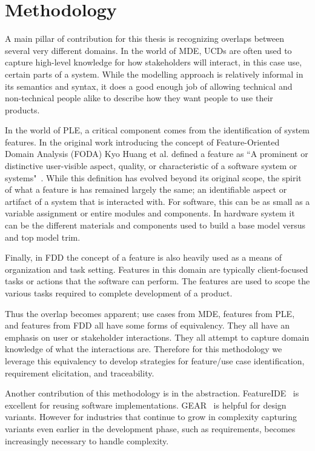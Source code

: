 \chapter{Methodology}



A main pillar of contribution for this thesis is recognizing overlaps between several very different domains. In the world of \ac{MDE}, \ac{UCD}s are often used to capture high-level knowledge for how stakeholders will interact, in this case use, certain parts of a system. While the modelling approach is relatively informal in its semantics and syntax, it does a good enough job of allowing technical and non-technical people alike to describe how they want people to use their products.

In the world of \ac{PLE}, a critical component comes from the identification of system features. In the original work introducing the concept of Feature-Oriented Domain Analysis (FODA) Kyo Huang et al. defined a feature as ``A prominent or distinctive user-visible aspect, quality, or characteristic of a software system or systems"~\cite{kang1990feature}. While this definition has evolved beyond its original scope, the spirit of what a feature is has remained largely the same; an identifiable aspect or artifact of a system that is interacted with. For software, this can be as small as a variable assignment or entire modules and components. In hardware system it can be the different materials and components used to build a base model versus and top model trim.

Finally, in \ac{FDD} the concept of a feature is also heavily used as a means of organization and task setting. Features in this domain are typically client-focused tasks or actions that the software can perform. The features are used to scope the various tasks required to complete development of a product. 

Thus the overlap becomes apparent; use cases from \ac{MDE}, features from \ac{PLE}, and features from \ac{FDD} all have some forms of equivalency. They all have an emphasis on user or stakeholder interactions. They all attempt to capture domain knowledge of what the interactions are. Therefore for this methodology we leverage this equivalency to develop strategies for feature/use case identification, requirement elicitation, and traceability.

Another contribution of this methodology is in the abstraction. FeatureIDE~\cite{thum2014featureide} is excellent for reusing software  implementations. GEAR~\cite{GEARS} is helpful for design variants. However for industries that continue to grow in complexity capturing variants even earlier in the development phase, such as requirements, becomes increasingly necessary to handle complexity.

